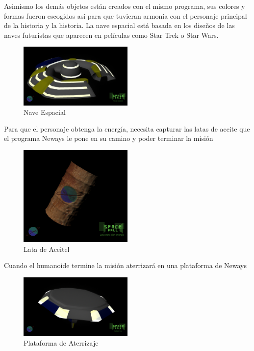 \documentclass[12pt, conference]{IEEEtran}
\begin{document}
Asimismo los dem\'{a}s objetos est\'{a}n creados con el mismo programa, sus colores y formas fueron escogidos as\'{i} para que tuvieran armon\'{i}a con el personaje principal de la historia y la historia. 
La nave espacial est\'{a} basada en los dise\~{n}os de las naves futuristas que aparecen en pel\'{i}culas como Star Trek o Star Wars.

\begin{figure}[h]
\caption{Nave Espacial}
\centering
\includegraphics[width=0.5\textwidth]{ship}
\end{figure}

Para que el personaje obtenga la energ\'{i}a, necesita capturar las latas de aceite que el programa Neways le pone en su camino y poder terminar la misi\'{o}n

\begin{figure}[h]
\caption{Lata de Aceitel}
\centering
\includegraphics[width=0.5\textwidth]{can}
\end{figure}

Cuando el humanoide termine la misi\'{o}n aterrizar\'{a} en una plataforma de Neways

\begin{figure}[h]
\caption{Plataforma de Aterrizaje}
\centering
\includegraphics[width=0.5\textwidth]{platform}
\end{figure}
\end{document}
